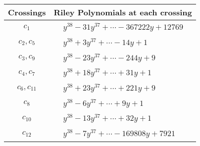 \documentclass[1p]{elsarticle_modified}
\theoremstyle{definition}
\begin{document}
\begin{tabular}{m{50pt}|m{274pt}}
Crossings & \hspace{64pt}Riley Polynomials at each crossing \\
\hline $$\begin{aligned}c_{1}\end{aligned}$$&$\begin{aligned}
&y^{38}-31 y^{37}+\cdots-367222 y+12769
\end{aligned}$\\
\hline $$\begin{aligned}c_{2},c_{5}\end{aligned}$$&$\begin{aligned}
&y^{38}+3 y^{37}+\cdots-14 y+1
\end{aligned}$\\
\hline $$\begin{aligned}c_{3},c_{9}\end{aligned}$$&$\begin{aligned}
&y^{38}-23 y^{37}+\cdots-244 y+9
\end{aligned}$\\
\hline $$\begin{aligned}c_{4},c_{7}\end{aligned}$$&$\begin{aligned}
&y^{38}+18 y^{37}+\cdots+31 y+1
\end{aligned}$\\
\hline $$\begin{aligned}c_{6},c_{11}\end{aligned}$$&$\begin{aligned}
&y^{38}+23 y^{37}+\cdots+221 y+9
\end{aligned}$\\
\hline $$\begin{aligned}c_{8}\end{aligned}$$&$\begin{aligned}
&y^{38}-6 y^{37}+\cdots+9 y+1
\end{aligned}$\\
\hline $$\begin{aligned}c_{10}\end{aligned}$$&$\begin{aligned}
&y^{38}-13 y^{37}+\cdots+32 y+1
\end{aligned}$\\
\hline $$\begin{aligned}c_{12}\end{aligned}$$&$\begin{aligned}
&y^{38}-7 y^{37}+\cdots-169808 y+7921
\end{aligned}$\\
\hline
\end{tabular}\\~\\
\end{document}
